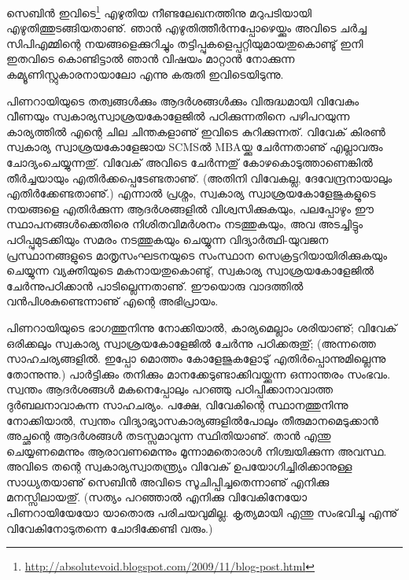﻿
\vskip 2pt


സെബിന്‍ ഇവിടെ\footnote{\url{http://absolutevoid.blogspot.com/2009/11/blog-post.html}} എഴുതിയ നീണ്ടലേഖനത്തിനു മറുപടിയായി എഴുതിത്തുടങ്ങിയതാണു്. ഞാന്‍ എഴുതിത്തീര്‍ന്നപ്പോഴെയ്ക്കും അവിടെ ചര്‍ച്ച സിപിഎമ്മിന്റെ നയങ്ങളെക്കുറിച്ചും തട്ടിപ്പുകളെപ്പറ്റിയുമായതുകൊണ്ടു് ഇനി ഇതവിടെ കൊണ്ടിട്ടാല്‍ ഞാന്‍ വിഷയം മാറ്റാന്‍ നോക്കുന്ന കമ്യൂണിസ്റ്റുകാരനായാലോ എന്നു കരുതി ഇവിടെയിടുന്നു.

പിണറായിയുടെ തത്വങ്ങള്‍ക്കും ആദര്‍ശങ്ങള്‍ക്കും വിരുദ്ധമായി വിവേകും വീണയും സ്വകാര്യസ്വാശ്രയകോളേജില്‍ പഠിക്കുന്നതിനെ പഴിപറയുന്ന കാര്യത്തില്‍ എന്റെ ചില ചിന്തകളാണു് ഇവിടെ കുറിക്കുന്നത്. വിവേക് കിരണ്‍ സ്വകാര്യ സ്വാശ്രയകോളേജായ SCMSല്‍ MBAയ്ക്കു ചേര്‍ന്നതാണു് എല്ലാവരും ചോദ്യംചെയ്യുന്നതു്. വിവേക് അവിടെ ചേര്‍ന്നതു് കോഴകൊടുത്താണെങ്കില്‍ തീര്‍ച്ചയായും എതിര്‍ക്കപ്പെടേണ്ടതാണു്. (അതിനി വിവേകല്ല, ദേവേന്ദ്രനായാലും എതിര്‍ക്കേണ്ടതാണു്.) എന്നാല്‍ പ്രശ്നം, സ്വകാര്യ സ്വാശ്രയകോളേജുകളുടെ നയങ്ങളെ എതിര്‍ക്കുന്ന ആദര്‍ശങ്ങളില്‍ വിശ്വസിക്കുകയും, പലപ്പോഴും ഈ സ്ഥാപനങ്ങള്‍ക്കെതിരെ നിശിതവിമര്‍ശനം നടത്തുകയും, അവ അടച്ചിട്ടും പഠിപ്പുമുടക്കിയും സമരം നടത്തുകയും ചെയ്യുന്ന വിദ്യാര്‍ത്ഥി-യുവജന പ്രസ്ഥാനങ്ങളുടെ മാതൃസംഘടനയുടെ സംസ്ഥാന സെക്രട്ടറിയായിരിക്കുകയും ചെയ്യുന്ന വ്യക്തിയുടെ മകനായതുകൊണ്ടു്, സ്വകാര്യ സ്വാശ്രയകോളേജില്‍ ചേര്‍ന്നുപഠിക്കാന്‍ പാടില്ലെന്നതാണു്. ഈയൊരു വാദത്തില്‍ വന്‍പിശകുണ്ടെന്നാണു് എന്റെ അഭിപ്രായം.

പിണറായിയുടെ ഭാഗത്തുനിന്നു നോക്കിയാല്‍, കാര്യമെല്ലാം ശരിയാണു്; വിവേക് ഒരിക്കലും സ്വകാര്യ സ്വാശ്രയകോളേജില്‍ ചേര്‍ന്നു പഠിക്കരുതു്; (അന്നത്തെ സാഹചര്യങ്ങളില്‍. ഇപ്പോ മൊത്തം കോളേജുകളോടു് എതിര്‍പ്പൊന്നുമില്ലെന്നു തോന്നുന്നു.) പാര്‍ട്ടിക്കും തനിക്കും മാനക്കേടുണ്ടാക്കിവയ്ക്കുന്ന ഒന്നാന്തരം സംഭവം. സ്വന്തം ആദര്‍ശങ്ങള്‍ മകനെപ്പോലും പറഞ്ഞു പഠിപ്പിക്കാനാവാത്ത ദുര്‍ബലനാവാകുന്ന സാഹചര്യം. പക്ഷേ, വിവേകിന്റെ സ്ഥാനത്തുനിന്നു നോക്കിയാല്‍, സ്വന്തം വിദ്യാഭ്യാസകാര്യങ്ങളില്‍പോലും തീരുമാനമെടുക്കാന്‍ അച്ഛന്റെ ആദര്‍ശങ്ങള്‍ തടസ്സമാവുന്ന സ്ഥിതിയാണു്. താന്‍ എന്തു ചെയ്യണമെന്നും ആരാവണമെന്നും മൂന്നാമതൊരാള്‍ നിശ്ചയിക്കുന്ന അവസ്ഥ. അവിടെ തന്റെ സ്വകാര്യസ്വാതന്ത്ര്യം വിവേക് ഉപയോഗിച്ചിരിക്കാനുള്ള സാധ്യതയാണു് സെബിന്‍ അവിടെ സൂചിപ്പിച്ചതെന്നാണു് എനിക്കു മനസ്സിലായതു്. (സത്യം പറഞ്ഞാല്‍ എനിക്കു വിവേകിനേയോ പിണറായിയേയോ യാതൊരു പരിചയവുമില്ല. കൃത്യമായി എന്തു സംഭവിച്ചു എന്നു് വിവേകിനോടുതന്നെ ചോദിക്കേണ്ടി വരും.)

